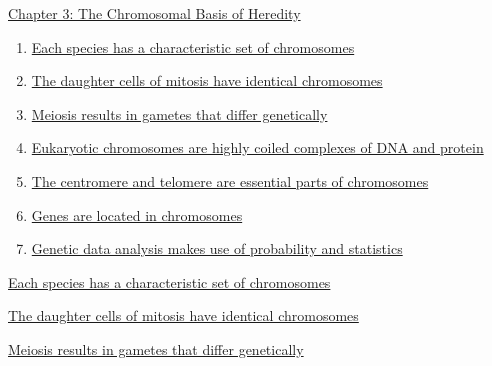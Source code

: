 \documentclass[12pt,letterpaper]{article}
\newcommand{\thetitle}{\hypertarget{home}{Essential Genetics and Genomics}}
\begin{document}


\clearpage

\renewcommand{\thetitle}{\hypertarget{3}{The Chromosomal Basis of Heredity}}
\hypertarget{3}{} 

\begin{chapbox}{\hyperlink{home}{Chapter 3: The Chromosomal Basis of Heredity}}
    \begin{enumerate}
        \item \hyperlink{3.1}{Each species has a characteristic set of chromosomes}
        \item \hyperlink{3.2}{The daughter cells of mitosis have identical chromosomes}
        \item \hyperlink{3.3}{Meiosis results in gametes that differ genetically}
        \item \hyperlink{3.4}{Eukaryotic chromosomes are highly coiled complexes of DNA and protein}
        \item \hyperlink{3.5}{The centromere and telomere are essential parts of chromosomes}
        \item \hyperlink{3.6}{Genes are located in chromosomes}
        \item \hyperlink{3.7}{Genetic data analysis makes use of probability and statistics}
    \end{enumerate}
\end{chapbox}


\hypertarget{3.1}{}
\begin{secbox}{\hyperlink{3}{Each species has a characteristic set of chromosomes}}{

}\end{secbox}

\hypertarget{3.2}{}
\begin{secbox}{\hyperlink{3}{The daughter cells of mitosis have identical chromosomes}}{

}\end{secbox}

\hypertarget{3.3}{}
\begin{secbox}{\hyperlink{3}{Meiosis results in gametes that differ genetically}}{

}\end{secbox}
\end{document}
